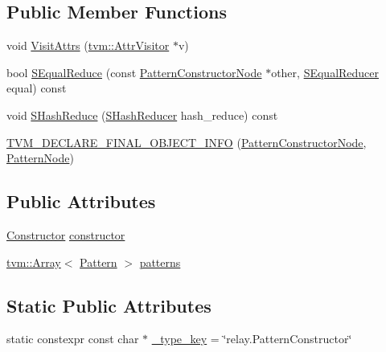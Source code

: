 \subsection*{Public Member Functions}
\begin{DoxyCompactItemize}
\item 
void \hyperlink{classtvm_1_1relay_1_1PatternConstructorNode_a8c5b04714541179bb05093ee5d5e13d5}{Visit\+Attrs} (\hyperlink{classtvm_1_1AttrVisitor}{tvm\+::\+Attr\+Visitor} $\ast$v)
\item 
bool \hyperlink{classtvm_1_1relay_1_1PatternConstructorNode_a5448348a780e5052a2d4ddbe0e9e5e10}{S\+Equal\+Reduce} (const \hyperlink{classtvm_1_1relay_1_1PatternConstructorNode}{Pattern\+Constructor\+Node} $\ast$other, \hyperlink{classtvm_1_1SEqualReducer}{S\+Equal\+Reducer} equal) const 
\item 
void \hyperlink{classtvm_1_1relay_1_1PatternConstructorNode_a530768aaafb43062bd756d96670c3d47}{S\+Hash\+Reduce} (\hyperlink{classtvm_1_1SHashReducer}{S\+Hash\+Reducer} hash\+\_\+reduce) const 
\item 
\hyperlink{classtvm_1_1relay_1_1PatternConstructorNode_a18b0c68de7b91821280b591b79086a39}{T\+V\+M\+\_\+\+D\+E\+C\+L\+A\+R\+E\+\_\+\+F\+I\+N\+A\+L\+\_\+\+O\+B\+J\+E\+C\+T\+\_\+\+I\+N\+FO} (\hyperlink{classtvm_1_1relay_1_1PatternConstructorNode}{Pattern\+Constructor\+Node}, \hyperlink{classtvm_1_1relay_1_1PatternNode}{Pattern\+Node})
\end{DoxyCompactItemize}
\subsection*{Public Attributes}
\begin{DoxyCompactItemize}
\item 
\hyperlink{namespacetvm_1_1relay_aec85bf097deda59bd22e88475c9165e9}{Constructor} \hyperlink{classtvm_1_1relay_1_1PatternConstructorNode_a4ad38292de4758a711a01982ebf78f54}{constructor}
\item 
\hyperlink{classtvm_1_1Array}{tvm\+::\+Array}$<$ \hyperlink{classtvm_1_1relay_1_1Pattern}{Pattern} $>$ \hyperlink{classtvm_1_1relay_1_1PatternConstructorNode_a0a09dff6a8e84eee02f6af3b2f523894}{patterns}
\end{DoxyCompactItemize}
\subsection*{Static Public Attributes}
\begin{DoxyCompactItemize}
\item 
static constexpr const char $\ast$ \hyperlink{classtvm_1_1relay_1_1PatternConstructorNode_ac28bdec2b8ce1c54567369eb717acc42}{\+\_\+type\+\_\+key} = \char`\"{}relay.\+Pattern\+Constructor\char`\"{}
\end{DoxyCompactItemize}


